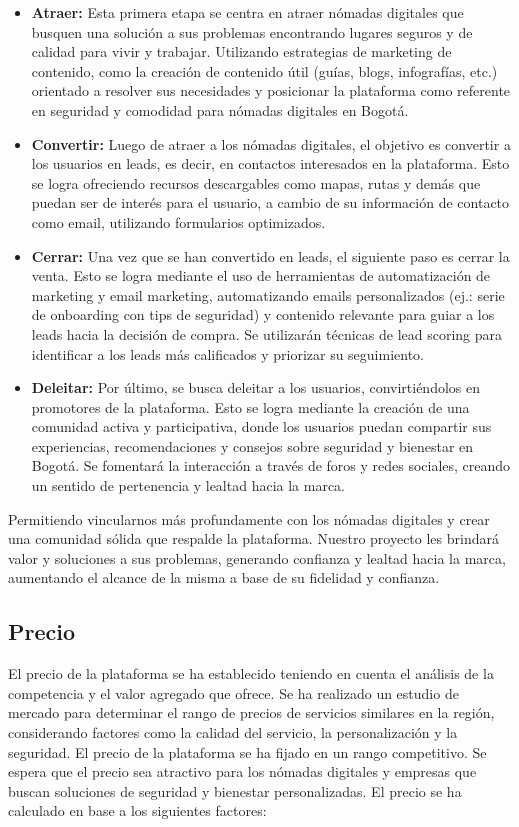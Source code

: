 \begin{itemize}
    \item \textbf{Atraer:} Esta primera etapa se centra en atraer nómadas digitales que busquen una solución a sus problemas encontrando lugares seguros y de calidad para vivir y trabajar. Utilizando estrategias de marketing de contenido, como la creación de contenido útil (guías, blogs, infografías, etc.) orientado a resolver sus necesidades y posicionar la plataforma como referente en seguridad y comodidad para nómadas digitales en Bogotá.
    \item \textbf{Convertir:} Luego de atraer a los nómadas digitales, el objetivo es convertir a los usuarios en leads, es decir, en contactos interesados en la plataforma. Esto se logra ofreciendo recursos descargables como mapas, rutas y demás que puedan ser de interés para el usuario, a cambio de su información de contacto como email, utilizando formularios optimizados.
    \item \textbf{Cerrar:} Una vez que se han convertido en leads, el siguiente paso es cerrar la venta. Esto se logra mediante el uso de herramientas de automatización de marketing y email marketing, automatizando emails personalizados (ej.: serie de onboarding con tips de seguridad) y contenido relevante para guiar a los leads hacia la decisión de compra. Se utilizarán técnicas de lead scoring para identificar a los leads más calificados y priorizar su seguimiento.
    \item \textbf{Deleitar:} Por último, se busca deleitar a los usuarios, convirtiéndolos en promotores de la plataforma. Esto se logra mediante la creación de una comunidad activa y participativa, donde los usuarios puedan compartir sus experiencias, recomendaciones y consejos sobre seguridad y bienestar en Bogotá. Se fomentará la interacción a través de foros y redes sociales, creando un sentido de pertenencia y lealtad hacia la marca.
\end{itemize}

Permitiendo vincularnos más profundamente con los nómadas digitales y crear una comunidad sólida que respalde la plataforma. Nuestro proyecto les brindará valor y soluciones a sus problemas, generando confianza y lealtad hacia la marca, aumentando el alcance de la misma a base de su fidelidad y confianza.

\subsection*{Precio}
El precio de la plataforma se ha establecido teniendo en cuenta el análisis de la competencia y el valor agregado que ofrece. Se ha realizado un estudio de mercado para determinar el rango de precios de servicios similares en la región, considerando factores como la calidad del servicio, la personalización y la seguridad.
El precio de la plataforma se ha fijado en un rango competitivo. Se espera que el precio sea atractivo para los nómadas digitales y empresas que buscan soluciones de seguridad y bienestar personalizadas. El precio se ha calculado en base a los siguientes factores:

